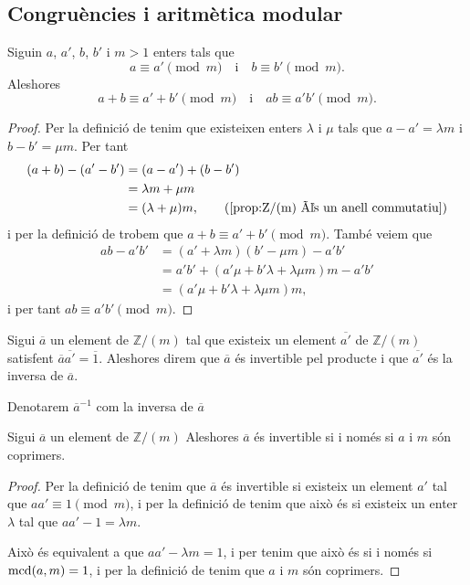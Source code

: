 \documentclass[../../Main.tex]{subfiles}
\begin{document}
	\subsection{Congruències i aritmètica modular}
	\begin{proposition}
		Siguin \(a\), \(a'\), \(b\), \(b'\) i \(m>1\) enters tals que
		\[a\equiv a'\pmod{m}\quad\text{i}\quad b\equiv b'\pmod{m}.\]
		Aleshores
		\[a+b\equiv a'+b'\pmod{m}\quad\text{i}\quad ab\equiv a'b'\pmod{m}.\]
		\begin{proof}
			Per la definició de  tenim que existeixen enters \(\lambda\) i \(\mu\) tals que \(a-a'=\lambda m\) i \(b-b'=\mu m\). Per tant
			\begin{align*}
			(a+b)-(a'-b')&=(a-a')+(b-b')\\
			&=\lambda m+\mu m\\
			&=(\lambda+\mu)m,\tag{\ref{prop:Z/(m) és un anell commutatiu}}
			\end{align*}
			i per la definició de  trobem que \(a+b\equiv a'+b'\pmod{m}\). També veiem que
			\begin{align*}
			ab-a'b'&=(a'+\lambda m)(b'-\mu m)-a'b'\\
			&=a'b'+(a'\mu+b'\lambda+\lambda\mu m)m-a'b'\\
			&=(a'\mu+b'\lambda+\lambda\mu m)m,
			\end{align*}
			i per tant \(ab\equiv a'b'\pmod{m}\).
		\end{proof}
	\end{proposition}
	\begin{definition}
		\label{def:nombre modular invertible}
		Sigui \(\overline{a}\) un element de \(\mathbb{Z}/(m)\) tal que existeix un element \(\overline{a'}\) de \(\mathbb{Z}/(m)\) satisfent \(\overline{a}\overline{a'}=\overline{1}\). Aleshores direm que \(\overline{a}\) és invertible pel producte i que \(\overline{a'}\) és la inversa de \(\overline{a}\).
		
		Denotarem \(\overline{a}^{-1}\) com la inversa de \(\overline{a}\)
	\end{definition}
	\begin{proposition}
		\label{prop:condició equivalent a invertible en Z/(m)}
		Sigui \(\overline{a}\) un element de \(\mathbb{Z}/(m)\) Aleshores \(\overline{a}\) és invertible si i només si \(a\) i \(m\) són coprimers.
		\begin{proof}
			Per la definició de  tenim que \(\overline{a}\) és invertible si existeix un element \(a'\) tal que \(aa'\equiv1\pmod{m}\), i per la definició de  tenim que això és si existeix un enter \(\lambda\) tal que \(aa'-1=\lambda m\).
			
			Això és equivalent a que \(aa'-\lambda m=1\), i per  tenim que això és si i només si \(\operatorname{mcd}(a,m)=1\), i per la definició de  tenim que \(a\) i \(m\) són coprimers.
		\end{proof}
	\end{proposition}
\end{document}
